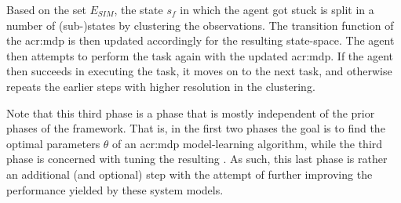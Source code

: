 Based on the set $E_\mathit{SIM}$, the state $s_f$ in which the agent got stuck is split in a number of (sub-)states by clustering the observations.
The transition function of the \acrshort{acr:mdp} is then updated accordingly for the resulting state-space.
The agent then attempts to perform the task again with the updated \acrshort{acr:mdp}.
If the agent then succeeds in executing the task, it moves on to the next task, and otherwise repeats the earlier steps with higher resolution in the clustering.

Note that this third phase is a phase that is mostly independent of the prior phases of the framework.
That is, in the first two phases the goal is to find the optimal parameters $\theta$ of an \acrshort{acr:mdp} model-learning algorithm, while the third phase is concerned with tuning the resulting .
As such, this last phase is rather an additional (and optional) step with the attempt of further improving the performance yielded by these system models.






